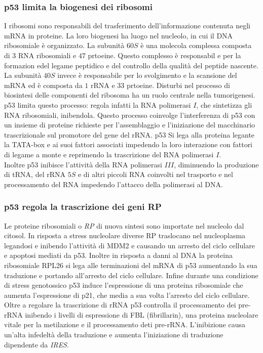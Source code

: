     \subsubsection{p53 limita la biogenesi dei ribosomi}
    I ribosomi sono responsabili del trasferimento dell'informazione contenuta negli mRNA in proteine.
    La loro biogenesi ha luogo nel nucleolo, in cui il DNA ribosomiale \`e organizzato.
    La subunit\`a $60S$ \`e una molecola complessa composta di $3$ RNA ribosomiali e $47$ prtoeine.
    Questo complesso \`e responsabil e per la formazion edel legame peptidico e del controllo della qualit\`a del peptide nascente.
    La subunit\`a $40S$ invece \`e responsabile per lo svolgimento e la scansione del mRNA ed \`e composta da $1$ rRNA e $33$ prtoeine.
    Disturbi nel processo di biosintesi delle componenti del ribosoma ha un ruolo centrale nella tumorigenesi.\\
    p53 limita questo processo: regola infatti la RNA polimerasi $I$, che sintetizza gli RNA ribosomiali, inibendola.
    Questo processo coinvolge l'interferenza di p53 con un insieme di proteine richieste per l'assemblaggio e l'iniziazione del macchinario trascrizionale sul promotore del gene del rRNA.
    p53 Si lega alla proteina legante la TATA-box e ai suoi fattori associati impedendo la loro interazione con fattori di legame a monte e reprimendo la trascrizione del RNA polimerasi $I$.\\
    Inoltre p53 inibisce l'attivit\`a della RNA polimerasi $III$, diminuendo la produzione di tRNA, del rRNA $5S$ e di altri piccoli RNA coinvolti nel trasporto e nel processamento del RNA impedendo l'attacco della polimerasi al DNA.

    \subsubsection{p53 regola la trascrizione dei geni RP}
    Le proteine ribosomiali o \emph{RP} di nuova sintesi sono importate nel nucleolo dal citosol.
    In risposta a stress nucleolare diverse RP traslocano nel nucleoplasma legandosi e inibendo l'attivit\`a di MDM2 e causando un arresto del ciclo cellulare e apoptosi mediati da p53.
    Inoltre in risposta a danni al DNA la proteina ribosomiale RPL26 si lega alle terminazioni del mRNA di p53 aumentando la sua traduzione e portando all'arresto del ciclo cellulare.
    Infine durante una condizione di stress genotossico p53 induce l'espressione di una proteina ribosomiale che aumenta l'espressione di p21, che media a sua volta l'arresto del ciclo cellulare.\\
    Oltre a regolare la trascrizione di rRNA p53 controlla il processamento dei pre-rRNA inibendo i livelli di espressione di FBL (fibrillarin), una proteina nucleolare vitale per la metilazione e il processamento deti pre-rRNA.
    L'inibizione causa un'alta infedelt\`a della traduzione e aumenta l'iniziazione di traduzione dipendente da \emph{IRES}.

